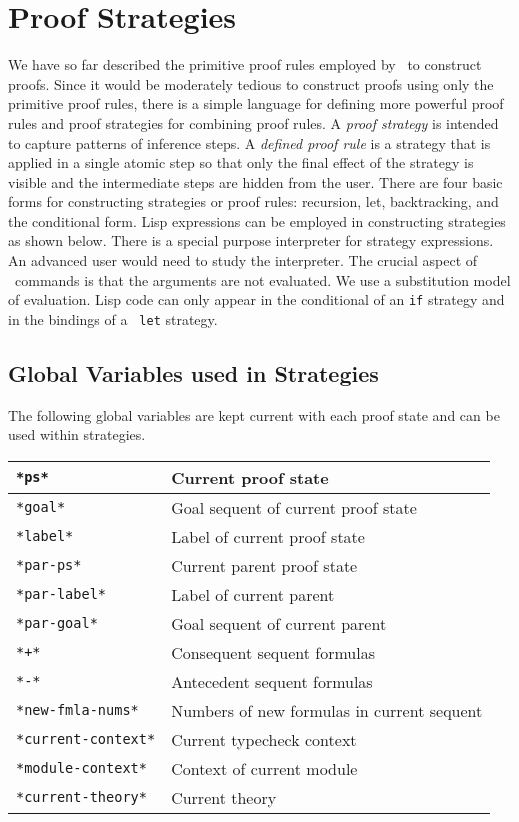 \documentclass[12pt,twoside]{book}
\makeatletter
\newcommand{\indtt}[1]{\texttt{#1}\index{#1@{\texttt{#1}}}}  %
\makeatother
\begin{document}
\pagebreak
\chapter{Proof Strategies}\label{strategy}


We have so far described the primitive proof rules employed by \pvs\ to
construct proofs.  Since it would be moderately tedious to construct
proofs using only the primitive proof rules, there is a simple language
for defining more powerful proof rules and proof strategies for
combining proof rules.  A \emph{proof strategy} is intended to capture
patterns of inference steps.  A \emph{defined proof rule} is a strategy
that is applied in a single atomic step so that only the final effect of
the strategy is visible and the intermediate steps are hidden from the
user.  There are four basic forms for constructing strategies or proof
rules: recursion, let, backtracking, and the conditional form.  Lisp
expressions can be employed in constructing strategies as shown below.
There is a special purpose interpreter for strategy expressions.  An
advanced user would  need to study the interpreter.  The crucial
aspect of \pvs\ commands is that the arguments are not evaluated.  We
use a substitution model of evaluation.  Lisp code can only appear in
the conditional of an \indtt{if} strategy and in the bindings of a {\tt
let} strategy.

\section{Global Variables used in Strategies}

The following global variables are kept current with each proof state
and can be used within strategies.  

\begin{tabular}{|l|l|}
\hline
\indtt{*ps*} & Current proof state \\\hline
\indtt{*goal*} & Goal sequent of current proof state \\\hline
\indtt{*label*} & Label of current proof state  \\\hline
\indtt{*par-ps*} & Current parent proof state \\\hline
\indtt{*par-label*} & Label of current parent \\\hline
\indtt{*par-goal*} & Goal sequent of current parent \\\hline
\indtt{*+*} & Consequent sequent formulas \\\hline
\indtt{*-*} & Antecedent sequent formulas \\\hline
\indtt{*new-fmla-nums*} &  Numbers of new formulas in current sequent
\\\hline
\indtt{*current-context*} & Current typecheck context \\\hline
\indtt{*module-context*} & Context of current module \\\hline
\indtt{*current-theory*} & Current theory \\\hline 
\end{tabular}
\end{document}
